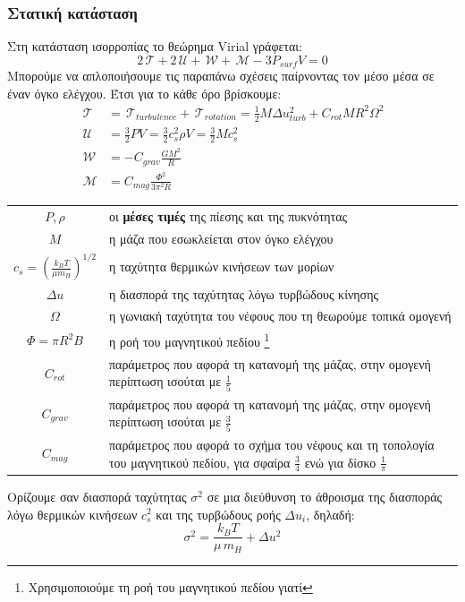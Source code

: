 \documentclass[a4paper,12pt]{memoir}
\newcommand{\TT}{\,\mathcal{T}}
\newcommand{\UU}{\,\mathcal{U}}
\newcommand{\WW}{\,\mathcal{W}}
\newcommand{\MM}{\,\mathcal{M}}
\begin{document}
\subsubsection{Στατική κατάσταση}
Στη κατάσταση ισορροπίας το θεώρημα Virial γράφεται:
\begin{equation}
\label{eq:Virial}
2\TT+2\UU +\WW+\MM -3P_{surf}V=0
\end{equation}
Μπορούμε να απλοποιήσουμε τις παραπάνω σχέσεις παίρνοντας τον μέσο μέσα σε έναν όγκο ελέγχου. Έτσι για το κάθε όρο βρίσκουμε:
\begin{align}
\TT &= \TT_{turbulence}+\TT_{rotation} = \frac{1}{2} M \Delta u_{turb} ^2 + C_{rot} M R^2 \Omega ^2\\
\UU &= \frac{3}{2} P V=\frac{3}{2} c_s ^2 \rho V=\frac{3}{2} M c_s ^2 \\
\WW &= -C_{grav} \frac{GM^2}{R} \\
\MM & = C_{mag}\frac{\Phi^2}{3 \pi ^2 R}
\end{align}
\noindent

\begin{tabular}{|c p{9cm}}
$P,\rho$ &οι \textbf{μέσες τιμές} της πίεσης και της πυκνότητας \\
$M$ &η μάζα που εσωκλείεται στον όγκο ελέγχου\\
$c_s =\left( \frac{k_B T}{\mu m_H}\right) ^{1/2}$ &η ταχύτητα θερμικών κινήσεων των μορίων \\
$\Delta u$ &η διασπορά της ταχύτητας λόγω τυρβώδους κίνησης \\
$\Omega$ &η γωνιακή ταχύτητα του νέφους που τη θεωρούμε τοπικά ομογενή \\
$\Phi=\pi R^2 B$ &η ροή του μαγνητικού πεδίου \footnote{Χρησιμοποιούμε τη ροή του μαγνητικού πεδίου γιατί } \\
$C_{rot}$ &παράμετρος που αφορά τη κατανομή της μάζας, στην ομογενή περίπτωση ισούται με $\frac{1}{5}$ \\
$C_{grav}$ &παράμετρος που αφορά τη κατανομή της μάζας, στην ομογενή περίπτωση ισούται με $\frac{3}{5}$ \\
$C_{mag}$ &παράμετρος που αφορά το σχήμα του νέφους και τη τοπολογία του μαγνητικού πεδίου, για σφαίρα $\frac{3}{4}$ ενώ για δίσκο $\frac{1}{\pi}$
\end{tabular}

\medskip

Ορίζουμε σαν διασπορά ταχύτητας $\sigma ^2$ σε μια διεύθυνση το άθροισμα της διασποράς λόγω θερμικών κινήσεων $c_s ^2 $ και της τυρβώδους ροής $\Delta u _i $, δηλαδή:
\begin{equation}
\label{eq:dispersion}
\sigma ^2=\frac{k_B T}{\mu \, m_H}+ \Delta u^2
\end{equation} 
\end{document}
